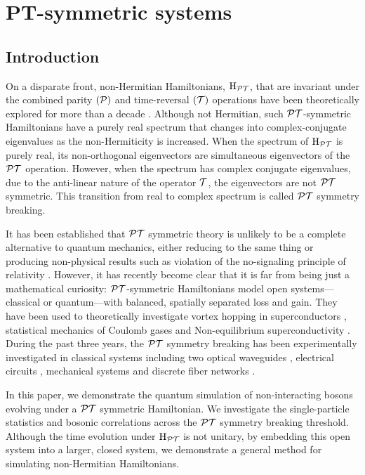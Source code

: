 \section{PT-symmetric systems}
\label{sec:PT}
\subsection{Introduction}

On a disparate front, non-Hermitian Hamiltonians, \(\mathrm{H}_{\mathcal{PT}{}}\), that are
invariant under the combined parity \((\mathcal{P})\) and time-reversal
\((\mathcal{T})\) operations have been theoretically explored for more than a
decade \cite{bender98, levai-jphysa-33-7165, bender07}. Although not Hermitian,
such \(\mathcal{PT}{}\)-symmetric
Hamiltonians have a purely real spectrum that changes into complex-conjugate
eigenvalues as the non-Hermiticity is increased. When the spectrum of
\(\mathrm{H}_{\mathcal{PT}{}}\) is purely real, its non-orthogonal eigenvectors are
simultaneous eigenvectors of the \(\mathcal{PT}{}\) operation. However, when the spectrum
has complex conjugate eigenvalues, due to the anti-linear nature of the operator
\(\mathcal{T}\), the eigenvectors are not \(\mathcal{PT}{}\) symmetric. This transition from
real to complex spectrum is called \(\mathcal{PT}{}\) symmetry breaking. 

It has been established that \(\mathcal{PT}{}\) symmetric theory is unlikely to be a
complete alternative to quantum mechanics, either reducing to the same thing
\cite{mostafazadeh-jmathphys-43-205} or producing non-physical results such as
violation of the no-signaling principle of relativity \cite{lee-prl-112-130404}.
However, it has recently become clear that it is far from being just a
mathematical curiosity: \(\mathcal{PT}{}\)-symmetric Hamiltonians model open
systems---classical or quantum---with balanced, spatially separated loss and
gain. They have been used to theoretically investigate vortex hopping in
superconductors \cite{naomichi-physrevlett-77-570},
statistical mechanics of Coulomb gases \cite{gulden-jetp-117-517} and
Non-equilibrium superconductivity \cite{rubinstein-physrevlett-99-167003,
serbyn-physrevb-87-020501}. During the past three years, the \(\mathcal{PT}{}\)
symmetry breaking has been experimentally investigated in classical systems
including two optical waveguides \cite{pt-ruter}, electrical circuits
\cite{schindler-physreva-84-040101}, mechanical systems
\cite{bender-amjphys-81-173} and discrete fiber networks
\cite{pt-regensburger}.

In this paper, we demonstrate the quantum simulation of non-interacting bosons
evolving under a \(\mathcal{PT}{}\) symmetric
Hamiltonian. We investigate the single-particle statistics and bosonic
correlations across the \(\mathcal{PT}{}\) symmetry breaking threshold. Although the time
evolution under \(\mathrm{H}_{\mathcal{PT}{}}\) is not unitary, by embedding this open
system into a larger, closed system, we demonstrate a general method for
simulating non-Hermitian Hamiltonians.

